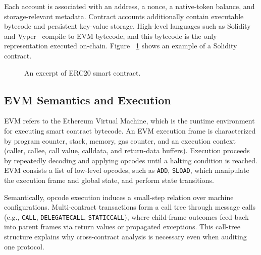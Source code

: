 Each account is associated with an address, 
a nonce, a native-token balance, and storage-relevant 
metadata. Contract accounts additionally 
contain executable bytecode and persistent key-value 
storage. High-level languages such as 
Solidity~\cite{solidity} and Vyper~\cite{vyper} compile to 
EVM bytecode, and this bytecode is the only 
representation executed on-chain. Figure
~\ref{fig:ERC20} shows an example of a Solidity contract. 



\begin{figure}[t]
    \centering
    \begin{minipage}[h]{0.9\linewidth}
    
    \end{minipage}
    \caption{An excerpt of ERC20 smart contract.}
    \label{fig:ERC20}
    \vspace{-2mm}
\end{figure}


\subsection{EVM Semantics and Execution}

EVM refers to the Ethereum Virtual Machine, which is the runtime 
environment for executing smart contract bytecode.
An EVM execution frame is characterized by program counter, 
stack, memory, gas counter, and an execution context 
(caller, callee, call value, calldata, and return-data buffers). 
Execution proceeds by repeatedly decoding 
and applying opcodes until a halting condition is reached.
EVM consists a list of 
low-level opcodes, such as \texttt{ADD}, \texttt{SLOAD},
which manipulate the execution frame and global state, 
and perform state transitions.

Semantically, opcode execution induces a small-step 
relation over machine configurations. Multi-contract 
transactions form a call tree through 
message calls (e.g., \texttt{CALL}, 
\texttt{DELEGATECALL}, \texttt{STATICCALL}), 
where child-frame outcomes feed back into parent 
frames via return values or propagated exceptions. 
This call-tree structure explains why cross-contract 
analysis is necessary even when auditing one protocol.


